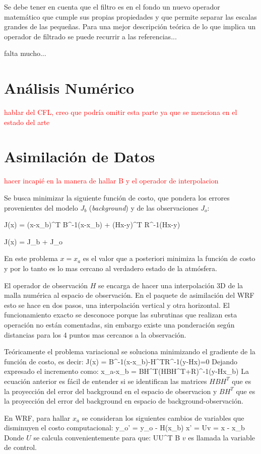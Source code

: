 Se debe tener en cuenta que el filtro es en el fondo un nuevo operador matemático que cumple sus propias propiedades y que permite separar las escalas grandes de las pequeñas. Para una mejor descripción teórica de lo que implica un operador de filtrado se puede recurrir a las referencias...

falta mucho...
\section{Análisis Numérico}
\textcolor{red}{hablar del CFL, creo que podría omitir esta parte ya que se menciona en el estado del arte}
\section{Asimilación de Datos}
\textcolor{red}{hacer incapié en la manera de hallar B y el operador de interpolacion}

Se busca minimizar la siguiente función de costo, que pondera los errores provenientes del modelo $J_b$ (\emph{background}) y de las observaciones $J_o$:

\be 
J(x) = (x-x_b)^T B^{-1}(x-x_b) + (Hx-y)^T R^{-1}(Hx-y)
\ee 

\be 
J(x) = J_b + J_o
\ee 

En este problema $x=x_a$ es el valor que a posteriori minimiza la función de costo y por lo tanto es lo mas cercano al verdadero estado de la atmósfera.

El operador de observación $H$ se encarga de hacer una interpolación 3D de la malla numérica al espacio de observación. En el paquete de asimilación del WRF esto se hace en dos pasos, una interpolación vertical y otra horizontal. El funcionamiento exacto se desconoce porque las subrutinas que realizan esta operación no están comentadas, sin embargo existe una ponderación según distancias para los 4 puntos mas cercanos a la observación. 

Teóricamente el problema variacional se soluciona minimizando el gradiente de la función de costo, es decir:
\be 
\nabla J(x) = B^{-1}(x-x_b)-H^TR^{-1}(y-Hx)=0
\ee
Dejando expresado el incremento como:
\be 
x_a-x_b = BH^T(HBH^T+R)^{-1}(y-Hx_b)
\ee
La ecuación anterior es fácil de entender si se identifican las matrices $HBH^T$ que es la proyección del error del background en el espacio de observacion y $BH^T$ que es la proyección del error del background en espacio de background-observación.
\bigskip

En WRF, para hallar $x_a$ se consideran los siguientes cambios de variables que disminuyen el costo computacional:
\be 
y_o' = y_o - H(x_b)
\ee 
\be 
x' = Uv = x - x_b
\ee
Donde $U$ se calcula convenientemente para que:
\be 
UU^T \approx B
\ee
$v$ es llamada la variable de control.

